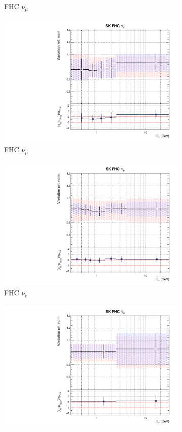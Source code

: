 \begin{figure}[t]
\begin{subfigure}{0.42\textwidth}
  \caption{\SK FHC $\nu_{\mu}$}
\end{subfigure}
\begin{subfigure}{0.42\textwidth}
  \centering
  \includegraphics[width=0.75\linewidth]{figs/rhcmpdat248flux_9}
  \caption{\SK FHC $\bar{\nu_{\mu}}$}
\end{subfigure}
\begin{subfigure}{0.42\textwidth}
  \centering
  \includegraphics[width=0.75\linewidth]{figs/rhcmpdat248flux_10}
  \caption{\SK FHC $\nu_e$}
\end{subfigure}
\begin{subfigure}{0.42\textwidth}
  \centering
  \includegraphics[width=0.75\linewidth]{figs/rhcmpdat248flux_11}

\end{subfigure}
\end{figure}
